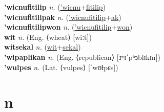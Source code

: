 \textbf{'wicnufitilip} \textit{n.} (\hyperref['wicnu]{'wicnu}+\hyperref[fitilip]{fitilip})
 \label{'wicnufitilip} \\
\textbf{'wicnufitilipak} \textit{n.} (\hyperref['wicnufitilip]{'wicnufitilip}+\hyperref[ak]{ak})
 \label{'wicnufitilipak} \\
\textbf{'wicnufitilipwon} \textit{n.} (\hyperref['wicnufitilip]{'wicnufitilip}+\hyperref[won]{won})
 \label{'wicnufitilipwon} \\
\textbf{wit} \textit{n.} (Eng. ⟨wheat⟩ [wiːt])
 \label{wit} \\
\textbf{witsekal} \textit{n.} (\hyperref[wit]{wit}+\hyperref[sekal]{sekal})
 \label{witsekal} \\
\textbf{'wipaplikan} \textit{n.} (Eng. ⟨republican⟩ [ɹʷɪˈpʰɜblɪkɪn])
 \label{'wipaplikan} \\
\textbf{'wulpes} \textit{n.} (Lat. ⟨vulpes⟩ [ˈwʊɫpɛs])
 \label{'wulpes} 

\section{n}

